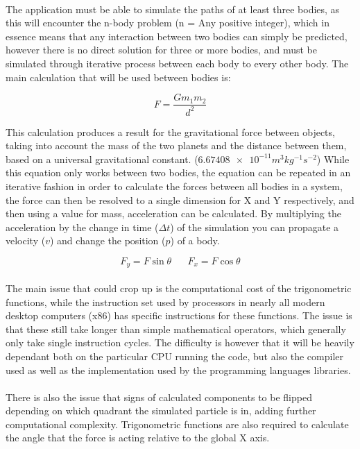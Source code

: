 \paragraph{}
The application must be able to simulate the paths of at least three bodies, as this will encounter the n-body problem (n = Any positive integer), which in essence means that any interaction between two bodies can simply be predicted, however there is no direct solution for three or more bodies, and must be simulated through iterative process between each body to every other body.
The main calculation that will be used between bodies is:

$$F=\frac{Gm_1m_2}{d^2}$$

This calculation produces a result for the gravitational force between objects, taking into account the mass of the two planets and the distance between them, based on a universal gravitational constant. ($\num{6.67408e-11} m^{3} kg^{-1} s^{-2}$) 
While this equation only works between two bodies, the equation can be repeated in an iterative fashion in order to calculate the forces between all bodies in a system, the force can then be resolved to a single dimension for X and Y respectively, and then using a value for mass, acceleration can be calculated. By multiplying the acceleration by the change in time ($\Delta t$) of the simulation you can propagate a velocity ($v$) and change the position ($p$) of a body.

$$F_y=F\sin{\theta} \hspace{20pt} F_x=F\cos{\theta}$$

\paragraph{}
The main issue that could crop up is the computational cost of the trigonometric functions, while the instruction set used by processors in nearly all modern desktop computers (x86) has specific instructions for these functions.
The issue is that these still take longer than simple mathematical operators, which generally only take single instruction cycles. The difficulty is however that it will be heavily dependant both on the particular CPU running the code, but also the compiler used as well as the implementation used by the programming languages libraries.

\paragraph{}
There is also the issue that signs of calculated components to be flipped depending on which quadrant the simulated particle is in, adding further computational complexity. Trigonometric functions are also required to calculate the angle that the force is acting relative to the global X axis.

